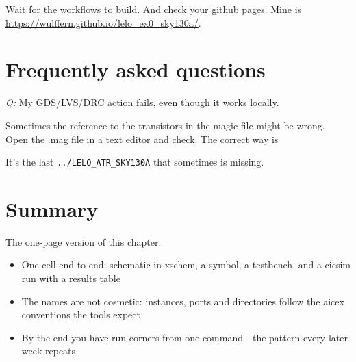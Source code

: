 Wait for the workflows to build. And check your github pages. Mine is
\url{https://wulffern.github.io/lelo_ex0_sky130a/}.

\section{Frequently asked questions}\label{frequently-asked-questions}

\emph{Q:} My GDS/LVS/DRC action fails, even though it works locally.

Sometimes the reference to the transistors in the magic file might be
wrong. Open the .mag file in a text editor and check. The correct way is

\begin{Shaded}
\begin{Highlighting}[]
\end{Highlighting}
\end{Shaded}

It's the last \texttt{../LELO\_ATR\_SKY130A} that sometimes is missing.

\section{Summary}\label{summary}

The one-page version of this chapter:

\begin{itemize}
\tightlist
\item
  One cell end to end: schematic in xschem, a symbol, a testbench, and a
  cicsim run with a results table
\item
  The names are not cosmetic: instances, ports and directories follow
  the aicex conventions the tools expect
\item
  By the end you have run corners from one command - the pattern every
  later week repeats
\end{itemize}
